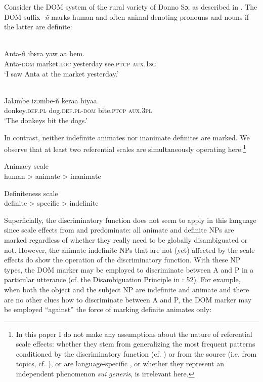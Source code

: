 \documentclass[output=paper]{langsci/langscibook}
\begin{document}
Consider the DOM system of the rural variety of Donno Sɔ, as described in \citet{Culy1995}. The DOM suffix \nobreakdash-\textit{ñ} marks human and often animal-denoting pronouns and nouns if the latter are definite:

\ea\label{ex:serzant:4}
\\
\gll   Anta-ñ     ibɛra     yaw     aa      bem.\\
     Anta-\textsc{dom}  market.\textsc{loc}  yesterday  see.\textsc{ptcp} \textsc{aux.1sg}\\
\glt ‘I saw Anta at the market yesterday.’
\z

\ea\label{ex:serzant:5}
\\
\gll  Jalɔmbe   izɔmbe-ñ     keraa     biyaa.\\
     donkey.\textsc{def.pl} dog.\textsc{def.pl-dom}   bite.\textsc{ptcp}   \textsc{aux.3pl}\\
\glt ‘The donkeys bit the dogs.’
\z

In contrast, neither indefinite animates nor inanimate definites are marked. We observe that at least two referential scales are simultaneously operating here:\footnote{In this paper I do not make any assumptions about the nature of referential scale effects: whether they stem from generalizing the most frequent patterns conditioned by the discriminatory function (cf. \citealt{Aissen2003}) or from the source (i.e. from topics, cf. \citealt{DalrympleNikolaeva2011}), or are language-specific \citep{BickelEtAl2015}, or whether they represent an independent phenomenon \textit{sui} \textit{generis}, is irrelevant here.}

\ea\label{ex:serzant:6}
Animacy scale\\
human > animate > inanimate
\z

\ea\label{ex:serzant:7}
Definiteness scale\\
definite > specific > indefinite
\z

Superficially, the discriminatory function does not seem to apply in this language since scale effects from  and  predominate: all animate and definite NPs are marked regardless of whether they really need to be globally disambiguated or not. However, the animate indefinite NPs that are not (yet) affected by the scale effects do show the operation of the discriminatory function. With these NP types, the DOM marker may be employed to discriminate between A and P in a particular utterance (cf. the Disambiguation Principle in \citealt{Culy1995}: 52). For example, when both the object and the subject NP are indefinite and animate and there are no other clues how to discriminate between A and P, the DOM marker may be employed “against” the force of marking definite animates only:
\end{document}
